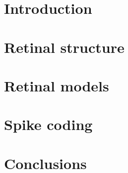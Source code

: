 \section{Introduction}
\section{Retinal structure}
\section{Retinal models}
\section{Spike coding}
\section{Conclusions}